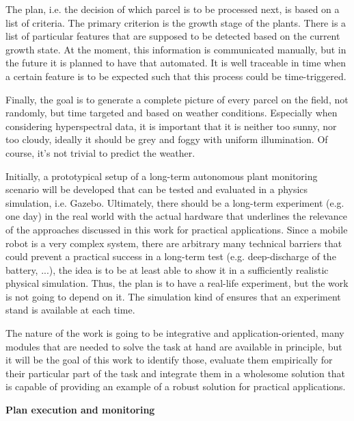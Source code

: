 \documentclass[german, master, expose, latin1]{base/thesis_KBS}
\begin{document}
The plan, i.e. the decision of which parcel is to be processed next, is based on a list of criteria. The primary criterion is the growth stage of the plants.
There is a list of particular features that are supposed to be detected based on the current growth state.
At the moment, this information is communicated manually, but in the future it is planned to have that automated.
It is well traceable in time when a certain feature is to be expected such that this process could be time-triggered.\newline

Finally, the goal is to generate a complete picture of every parcel on the field, not randomly, but time targeted and based on weather conditions. 
Especially when considering hyperspectral data, it is important that it is neither too sunny, nor too cloudy, ideally it should be grey and foggy with uniform illumination.
Of course, it's not trivial to predict the weather.\newline

Initially, a prototypical setup of a long-term autonomous plant monitoring scenario will be developed that can be tested and evaluated 
in a physics simulation, i.e. Gazebo. Ultimately, there should be a long-term experiment (e.g. one day) in the real world with the actual hardware that
underlines the relevance of the approaches discussed in this work for practical applications. Since a mobile robot is a very complex system, there are arbitrary many 
technical barriers that could prevent a practical success in a long-term test (e.g. deep-discharge of the battery, ...), the idea is to be at least able to show 
it in a sufficiently realistic physical simulation. Thus, the plan is to have a real-life experiment, but the work is not going to depend on it.
The simulation kind of ensures that an experiment stand is available at each time.\newline

The nature of the work is going to be integrative and application-oriented, many modules that are needed to solve the task at hand are available in principle, 
but it will be the goal of this work to identify those, evaluate them empirically for their particular part of the task and integrate them in a wholesome 
solution that is capable of providing an example of a robust solution for practical applications.\newline

\textbf{Plan execution and monitoring}\newline
\end{document}
